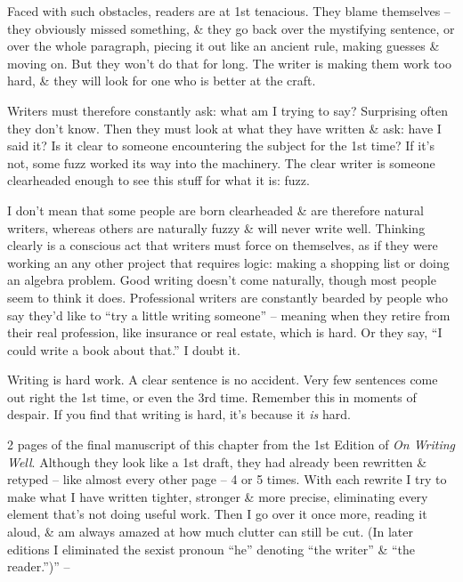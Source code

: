 \documentclass{article}
\begin{document}
Faced with such obstacles, readers are at 1st tenacious. They blame themselves -- they obviously missed something, \& they go back over the mystifying sentence, or over the whole paragraph, piecing it out like an ancient rule, making guesses \& moving on. But they won't do that for long. The writer is making them work too hard, \& they will look for one who is better at the craft.

Writers must therefore constantly ask: what am I trying to say? Surprising often they don't know. Then they must look at what they have written \& ask: have I said it? Is it clear to someone encountering the subject for the 1st time? If it's not, some fuzz worked its way into the machinery. The clear writer is someone clearheaded enough to see this stuff for what it is: fuzz.

I don't mean that some people are born clearheaded \& are therefore natural writers, whereas others are naturally fuzzy \& will never write well. Thinking clearly is a conscious act that writers must force on themselves, as if they were working an any other project that requires logic: making a shopping list or doing an algebra problem. Good writing doesn't come naturally, though most people seem to think it does. Professional writers are constantly bearded by people who say they'd like to ``try a little writing someone'' -- meaning when they retire from their real profession, like insurance or real estate, which is hard. Or they say, ``I could write a book about that.'' I doubt it.

Writing is hard work. A clear sentence is no accident. Very few sentences come out right the 1st time, or even the 3rd time. Remember this in moments of despair. If you find that writing is hard, it's because it \textit{is} hard.

2 pages of the final manuscript of this chapter from the 1st Edition of \textit{On Writing Well}. Although they look like a 1st draft, they had already been rewritten \& retyped -- like almost every other page -- 4 or 5 times. With each rewrite I try to make what I have written tighter, stronger \& more precise, eliminating every element that's not doing useful work. Then I go over it once more, reading it aloud, \& am always amazed at how much clutter can still be cut. (In later editions I eliminated the sexist pronoun ``he'' denoting ``the writer'' \& ``the reader.'')'' -- \cite[pp. 15--17]{Zinsser2016}

\end{document}

